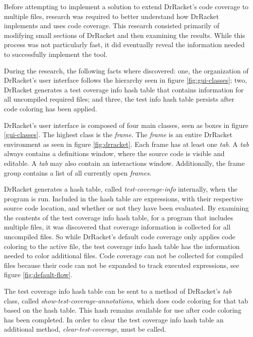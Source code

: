 Before attempting to implement a solution to extend DrRacket's code coverage to multiple files, research was required to better understand how DrRacket implements and uses code coverage. This research consisted primarily of modifying small sections of DrRacket and then examining the results. While this process was not particularly fast, it did eventually reveal the information needed to successfully implement the tool.

During the research, the following facts where discovered: one, the organization of DrRacket's user interface follows the hierarchy seen in figure \ref{fig:gui-classes}; two, DrRacket generates a test coverage info hash table that contains information for all uncompiled required files; and three, the test info hash table persists after code coloring has been applied.

DrRacket's user interface is composed of four main classes, seen as boxes in figure \ref{gui-classes}. The highest class is the \emph{frame}. The \emph{frame} is an entire DrRacket environment as seen in figure \ref{fig:drracket}. Each frame has at least one \emph{tab}. A \emph{tab} always contains a definitions window, where the source code is visible and editable. A \emph{tab} may also contain an interactions window. Additionally, the frame group contains a list of all currently open \emph{frames}.


DrRacket generates a hash table, called \emph{test-coverage-info} internally, when the program is run. Included in the hash table are expressions, with their respective source code location, and whether or not they have been evaluated. By examining the contents of the test coverage info hash table, for a program that includes multiple files, it was discovered that coverage information is collected for all uncompiled files. So while DrRacket's default code coverage only applies code coloring to the active file, the test coverage info hash table has the information needed to color additional files. Code coverage can not be collected for compiled files because their code can not be expanded to track executed expressions, see figure \ref{fig:default-flow}.

The test coverage info hash table can be sent to a method of DrRacket's \emph{tab} class, called \emph{show-test-coverage-annotations}, which does code coloring for that tab based on the hash table. This hash remains available for use after code coloring has been completed. In order to clear the test coverage info hash table an additional method, \emph{clear-test-coverage}, must be called. 

